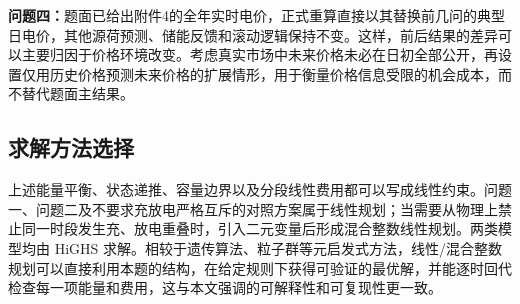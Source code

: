 \indent\textbf{问题四：}题面已给出附件4的全年实时电价，正式重算直接以其替换前几问的典型日电价，其他源荷预测、储能反馈和滚动逻辑保持不变。这样，前后结果的差异可以主要归因于价格环境改变。考虑真实市场中未来价格未必在日初全部公开，再设置仅用历史价格预测未来价格的扩展情形，用于衡量价格信息受限的机会成本，而不替代题面主结果。

\subsection{求解方法选择}

上述能量平衡、状态递推、容量边界以及分段线性费用都可以写成线性约束。问题一、问题二及不要求充放电严格互斥的对照方案属于线性规划；当需要从物理上禁止同一时段发生充、放电重叠时，引入二元变量后形成混合整数线性规划。两类模型均由 HiGHS 求解。相较于遗传算法、粒子群等元启发式方法，线性/混合整数规划可以直接利用本题的结构，在给定规则下获得可验证的最优解，并能逐时回代检查每一项能量和费用，这与本文强调的可解释性和可复现性更一致。
